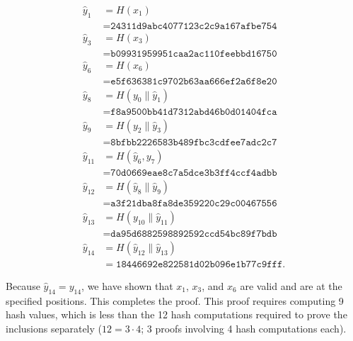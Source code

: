 \begin{example}
\begin{align}
    \hat{y}_{1} &= H(x_{1}) \nonumber\\
        &= \texttt{24311d9abc4077123c2c9a167afbe754}
            \nonumber\\
    \hat{y}_{3} &= H(x_{3}) \nonumber\\
        &= \texttt{b09931959951caa2ac110feebbd16750}
            \nonumber\\
    \hat{y}_{6} &= H(x_{6}) \nonumber\\
        &= \texttt{e5f636381c9702b63aa666ef2a6f8e20}
            \nonumber\\
    \hat{y}_{8} &= H(y_{0}\|\hat{y}_{1}) \nonumber\\
        &= \texttt{f8a9500bb41d7312abd46b0d01404fca}
            \nonumber\\
    \hat{y}_{9} &= H(y_{2}\|\hat{y}_{3}) \nonumber\\
        &= \texttt{8bfbb2226583b489fbc3cdfee7adc2c7}
            \nonumber\\
    \hat{y}_{11} &= H(\hat{y}_{6},y_{7}) \nonumber\\
        &= \texttt{70d0669eae8c7a5dce3b3ff4ccf4adbb}
            \nonumber\\
    \hat{y}_{12} &= H(\hat{y}_{8}\|\hat{y}_{9}) \nonumber\\
        &= \texttt{a3f21dba8fa8de359220c29c00467556}
            \nonumber\\
    \hat{y}_{13} &= H(y_{10}\|\hat{y}_{11}) \nonumber\\
        &= \texttt{da95d6882598892592ccd54bc89f7bdb}
            \nonumber\\
    \hat{y}_{14} &= H(\hat{y}_{12}\|\hat{y}_{13}) \nonumber\\
        &= \texttt{18446692e822581d02b096e1b77c9fff}.
\end{align}

\noindent
Because $\hat{y}_{14} = y_{14}$, we have shown that
$x_{1}$, $x_{3}$, and $x_{6}$ are valid and are at the specified positions.
This completes the proof.
This proof requires computing 9 hash values,
which is less than the 12 hash computations required to prove the inclusions
separately ($12 = 3\cdot 4$; 3 proofs involving 4 hash computations each).
\end{example}


